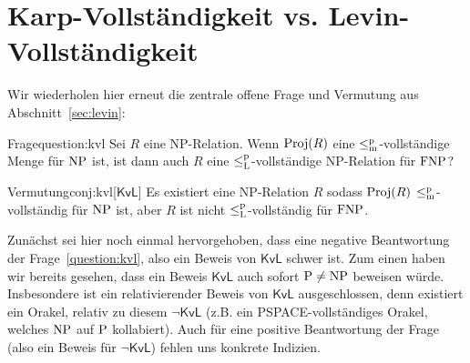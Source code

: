 
\section{Karp-Vollständigkeit vs. Levin-Vollständigkeit}\label{sec:karp-vs-levin}

Wir wiederholen hier erneut die zentrale offene Frage und Vermutung aus Abschnitt~\ref{sec:levin}:

\begin{reptheorem}{Frage}{question:kvl}
    Sei $R$ eine NP-Relation.
Wenn $\Proj(R)$ eine $\leqmp$-vollständige Menge für $\NP$ ist, ist dann auch $R$ eine $\leqlp$-vollständige NP-Relation für $\FNP$?
\end{reptheorem}

\begin{reptheorem}{Vermutung}{conj:kvl}[$\mathsf{KvL}$]
    Es existiert eine NP-Relation $R$ sodass $\Proj(R)$ $\leqmp$-vollständig für $\NP$ ist, aber $R$ ist nicht $\leqlp$-vollständig für $\FNP$.
\end{reptheorem}

Zunächst sei hier noch einmal hervorgehoben, dass eine negative Beantwortung der Frage~\ref{question:kvl}, also ein Beweis von $\mathsf{KvL}$ schwer ist. Zum einen haben wir bereits gesehen, dass ein Beweis $\mathsf{KvL}$ auch sofort $\P\neq\NP$ beweisen würde. Insbesondere ist ein relativierender Beweis von $\mathsf{KvL}$ ausgeschlossen, denn existiert ein Orakel, relativ zu diesem $\neg\mathsf{KvL}$ (z.B. ein PSPACE-vollständiges Orakel, welches $\NP$ auf $\P$ kollabiert).
Auch für eine positive Beantwortung der Frage (also ein Beweis für $\neg\mathsf{KvL}$) fehlen uns konkrete Indizien.

